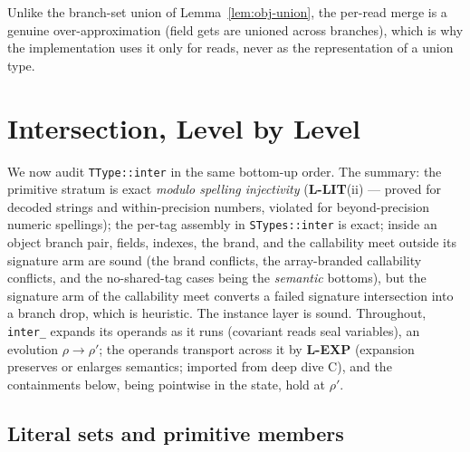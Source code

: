 \documentclass[11pt]{article}
\begin{document}
Unlike the branch-set union of Lemma~\ref{lem:obj-union}, the per-read
merge is a genuine over-approximation (field gets are unioned across
branches), which is why the implementation uses it only for reads,
never as the representation of a union type.

\section{Intersection, Level by Level}
\label{sec:inter}

We now audit \texttt{TType::inter} in the same bottom-up order. The
summary: the primitive stratum is exact \emph{modulo spelling injectivity}
(\textbf{L-LIT}(ii) — proved for decoded strings and within-precision
numbers, violated for beyond-precision numeric spellings); the per-tag
assembly in \texttt{STypes::inter} is exact; inside an object branch
pair, fields, indexes, the brand, and the callability meet outside its
signature arm are sound (the brand conflicts, the array-branded
callability conflicts, and the no-shared-tag cases being the
\emph{semantic} bottoms), but the signature arm of the callability meet
converts a failed signature intersection into a branch drop, which is
heuristic. The instance layer is sound. Throughout,
\texttt{inter\_} expands its operands as it runs (covariant reads seal
variables), an evolution $\rho \to \rho'$; the operands transport across
it by \textbf{L-EXP} (expansion preserves or enlarges semantics; imported
from deep dive C), and the containments below, being pointwise in the
state, hold at $\rho'$.

\subsection{Literal sets and primitive members}
\label{sec:inter-prim}
\end{document}

